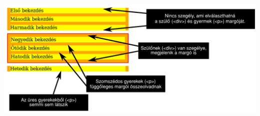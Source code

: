 \begin{frame}
  \begin{columns}[T]
      \begin{exampleblock}{}
        \scriptsize
        
      \end{exampleblock}
      \begin{exampleblock}{\vspace*{-3ex}}
        \scriptsize
        
      \end{exampleblock}
  \end{columns} 
\end{frame}

\begin{frame}
  \begin{center}
    \includegraphics[scale=0.55]{margok.pdf}
  \end{center}
\end{frame}

